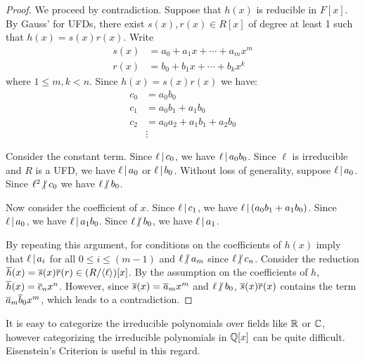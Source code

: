 \documentclass[11pt]{article}
\begin{document}
\begin{proof}
    We proceed by contradiction. Suppose that $h(x)$ is reducible in $F[x]$. By Gauss'  for UFDs, there exist $s(x),r(x)\in R[x]$ of degree at least 1 such that $h(x)=s(x)r(x)$. Write
    \begin{align*}
        s(x)&=a_0+a_1x+\cdots+a_mx^m \\
        r(x)&=b_0+b_1x+\cdots+b_kx^k
    \end{align*}
    where $1\leq m,k<n$. Since $h(x)=s(x)r(x)$ we have:
    \begin{align*}
        c_0&=a_0b_0 \\
        c_1&=a_0b_1+a_1b_0 \\
        c_2&=a_0a_2+a_1b_1+a_2b_0 \\
        &\vdots
    \end{align*}
    
    Consider the constant term. Since $\ell\,|\, c_0$, we have $\ell\,|\, a_0b_0$. Since $\ell$ is irreducible and $R$ is a UFD, we have $\ell\,|\, a_0$ or $\ell\,|\, b_0$. Without loss of generality, suppose $\ell\,|\, a_0$. Since $\ell^2\nd c_0$ we have $\ell\nd b_0$.

    Now consider the coefficient of $x$. Since $\ell\,|\, c_1$, we have $\ell\,|\, (a_0b_1+a_1b_0)$. Since $\ell\,|\, a_0$, we have $\ell\,|\, a_1b_0$. Since $\ell\nd b_0$, we have $\ell\,|\, a_1$.

    By repeating this argument, for conditions on the coefficients of $h(x)$ imply that $\ell\,|\, a_i$ for all $0\leq i\leq(m-1)$ and $\ell\nd a_m$ since $\ell\nd c_n$. Consider the reduction $\overline{h}(x)=\overline{s}(x)\overline{r}(r)\in(R/\langle\ell\rangle)[x]$. By the assumption on the coefficients of $h$, $\overline{h}(x)=\overline{c}_nx^n$. However, since $\overline{s}(x)=\overline{a}_mx^m$ and $\ell\nd b_0$, $\overline{s}(x)\overline{r}(x)$ contains the term $\overline{a}_m\overline{b}_0x^m$, which leads to a contradiction.
    
\end{proof}

\begin{remark}
    It is easy to categorize the irreducible polynomials over fields like $\mathbb{R}$ or $\mathbb{C}$, however categorizing the irreducible polynomials in $\mathbb{Q}[x]$ can be quite difficult. Eisenstein's Criterion is useful in this regard.
\end{remark}
\end{document}
